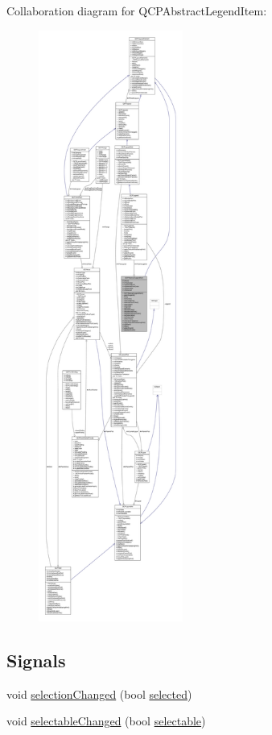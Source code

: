 Collaboration diagram for Q\+C\+P\+Abstract\+Legend\+Item\+:\nopagebreak
\begin{figure}[H]
\begin{center}
\leavevmode
\includegraphics[height=550pt]{class_q_c_p_abstract_legend_item__coll__graph}
\end{center}
\end{figure}
\subsection*{Signals}
\begin{DoxyCompactItemize}
\item 
void \hyperlink{class_q_c_p_abstract_legend_item_a7cb61fdfbaf69c590bacb8f9e7099d9e}{selection\+Changed} (bool \hyperlink{class_q_c_p_abstract_legend_item_ac776e68e3367704452131c6aa9908bb9}{selected})
\item 
void \hyperlink{class_q_c_p_abstract_legend_item_abc4d779b938cc9235f9196737dbaa6bd}{selectable\+Changed} (bool \hyperlink{class_q_c_p_abstract_legend_item_a0a0205f33f37edae50826c24cb8f1983}{selectable})
\end{DoxyCompactItemize}

